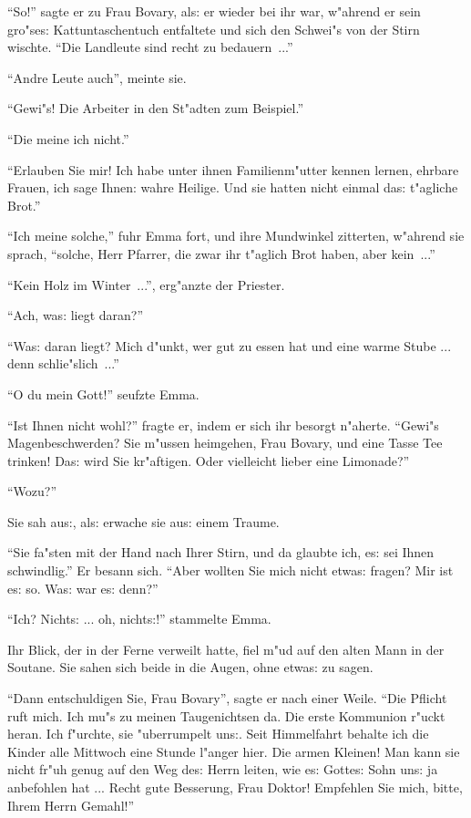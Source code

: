 \documentclass[oneside,12pt]{book}
\newcommand{\s}{s:}%
\begin{document}
"`So!"' sagte er zu Frau Bovary, al{\s} er wieder bei ihr war,
w"ahrend er sein gro"se{\s} Kattuntaschentuch entfaltete und sich
den Schwei"s von der Stirn wischte. "`Die Landleute sind recht zu
bedauern~..."'

"`Andre Leute auch"', meinte sie.

"`Gewi"s! Die Arbeiter in den St"adten zum Beispiel."'

"`Die meine ich nicht."'

"`Erlauben Sie mir! Ich habe unter ihnen Familienm"utter kennen
lernen, ehrbare Frauen, ich sage Ihnen: wahre Heilige. Und sie
hatten nicht einmal da{\s} t"agliche Brot."'

"`Ich meine solche,"' fuhr Emma fort, und ihre Mundwinkel
zitterten, w"ahrend sie sprach, "`solche, Herr Pfarrer, die zwar
ihr t"aglich Brot haben, aber kein~..."'

"`Kein Holz im Winter~..."', erg"anzte der Priester.

"`Ach, wa{\s} liegt daran?"'

"`Wa{\s} daran liegt? Mich d"unkt, wer gut zu essen hat und eine
warme Stube ... denn schlie"slich~..."'

"`O du mein Gott!"' seufzte Emma.

"`Ist Ihnen nicht wohl?"' fragte er, indem er sich ihr besorgt
n"aherte. "`Gewi"s Magenbeschwerden? Sie m"ussen heimgehen, Frau
Bovary, und eine Tasse Tee trinken! Da{\s} wird Sie kr"aftigen.
Oder vielleicht lieber eine Limonade?"'

"`Wozu?"'

Sie sah au{\s}, al{\s} erwache sie au{\s} einem Traume.

"`Sie fa"sten mit der Hand nach Ihrer Stirn, und da glaubte ich,
e{\s} sei Ihnen schwindlig."' Er besann sich. "`Aber wollten Sie
mich nicht etwa{\s} fragen? Mir ist e{\s} so. Wa{\s} war e{\s}
denn?"'

"`Ich? Nicht{\s} ... oh, nicht{\s}!"' stammelte Emma.

Ihr Blick, der in der Ferne verweilt hatte, fiel m"ud auf den
alten Mann in der Soutane. Sie sahen sich beide in die Augen, ohne
etwa{\s} zu sagen.

"`Dann entschuldigen Sie, Frau Bovary"', sagte er nach einer
Weile. "`Die Pflicht ruft mich. Ich mu"s zu meinen Taugenichtsen
da. Die erste Kommunion r"uckt heran. Ich f"urchte, sie
"uberrumpelt un{\s}. Seit Himmelfahrt behalte ich die Kinder alle
Mittwoch eine Stunde l"anger hier. Die armen Kleinen! Man kann sie
nicht fr"uh genug auf den Weg de{\s} Herrn leiten, wie e{\s}
Gotte{\s} Sohn un{\s} ja anbefohlen hat ... Recht gute Besserung,
Frau Doktor! Empfehlen Sie mich, bitte, Ihrem Herrn Gemahl!"'
\end{document}
